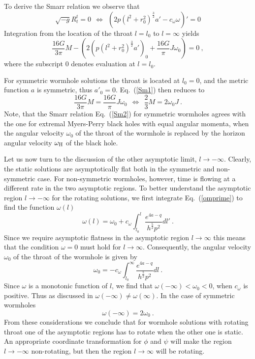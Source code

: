 \documentclass[showpacs,preprintnumbers,amsmath,amssymb,floatfix]{revtex4}
\begin{document}
To derive the Smarr relation we observe that 
%
\begin{equation}
\sqrt{-g} R^t_t = 0 \ \
\Longleftrightarrow \ \
\left(2 p (l^2+r_0^2)^{\frac{3}{2}} a' - c_\omega \omega\right)' = 0
\label{rtteq}
\end{equation}
%
Integration from  the location of the throat $l=l_0$ to $l=\infty$ yields
%
\begin{equation}
\frac{16 G}{3 \pi} M -
\left(2 \left(p (l^2+r_0^2)^{\frac{3}{2}} a'\right)_0 
     + \frac{16 G}{\pi} J \omega_0\right)
=0 \ , 
\label{Sm1}
\end{equation}
%
where the subscript $0$ denotes evaluation at $l=l_0$.

For symmetric wormhole solutions 
the throat is located at $l_0=0$,
and the metric function $a$ is symmetric, thus
$a'_0=0$. Eq.~(\ref{Sm1}) then reduces to
%
\begin{equation}
\frac{16 G}{3 \pi} M =
     \frac{16 G}{\pi} J \omega_0     \ \
\Longleftrightarrow \ \
\frac{2}{3} M =
     2  \omega_0 J \ .
\label{Sm2}
\end{equation}
%
Note, that the Smarr relation  Eq.~(\ref{Sm2}) for symmetric wormholes agrees with the 
one for  extremal Myers-Perry black holes with equal angular momenta, when the angular velocity $\omega_0$ 
of the throat of the wormhole is replaced
by the horizon angular velocity $\omega_{\rm H}$ of the black hole.

Let us now turn to the discussion of the other asymptotic limit,  $l \to -\infty$.
Clearly, the static solutions are asymptotically flat both in the
symmetric and non-symmetric case. For non-symmetric wormholes,
however, time is flowing at a different rate in the two 
asymptotic regions.
To better understand the asymptotic region $l \to -\infty$
for the rotating solutions,
we first integrate Eq.~(\ref{omprime})
to find the function $\omega(l)$
%
\begin{equation}
\omega(l)=\omega_0+ c_\omega \int_{l_0}^l \frac{e^{4a-q}}{h^{\frac{5}{2}}p^2 } dl'  \ .
\label{omint}
\end{equation}
%
Since we require asymptotic flatness in the asymptotic region $l \to \infty$
this means that 
the condition $\omega=0$ must hold for $l \to \infty$. Consequently,
the angular velocity $\omega_0$ 
of the throat of the wormhole is given by
%
\begin{equation}
\omega_0=- c_\omega \int_{l_0}^\infty  \frac{e^{4a-q}}{h^{\frac{5}{2}}p^2 } dl 
\ .
\label{om0}
\end{equation}
%
Since $\omega$ is a monotonic function of $l$, we find that
$\omega(-\infty) < \omega_0 < 0$, when $c_\omega$ is positive.
Thus as discussed in \cite{Khatsymovsky:1998tv}
$\omega(-\infty) \ne \omega(\infty)$.
In the case of symmetric wormholes
%
\begin{equation}
\omega(-\infty)= 2  \omega_0 \ .
\label{om-infty}
\end{equation}
%
{From} these considerations
we conclude that for wormhole solutions with rotating throat one
of the asymptotic regions has to rotate when the other one is static.
An appropriate coordinate transformation 
for $\phi$ and $\psi$ will make the region $l \to -\infty$
non-rotating, but then the region $l \to \infty$
will be rotating.
\end{document}
